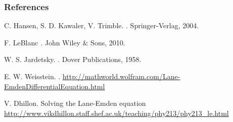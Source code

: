 \documentclass[handout]{beamer}
\begin{document}
        \begin{frame}[allowframebreaks]
            \frametitle{References}
            \begin{thebibliography}{10}

                \beamertemplatebookbibitems

                    C. Hansen, S. D. Kawaler, V. Trimble.
                    .
                    \newblock Springer-Verlag, 2004.

                    F. LeBlanc
                    .
                    \newblock John Wiley \& Sons, 2010.

                    W. S. Jardetsky.
                    .
                    \newblock Dover Publications, 1958.

                \beamertemplatearticlebibitems

                    E. W. Weisstein.
                    .
                    \newblock \url{http://mathworld.wolfram.com/Lane-EmdenDifferentialEquation.html}

                    V. Dhillon.
                    \newblock Solving the Lane-Emden equation
                    \newblock \url{http://www.vikdhillon.staff.shef.ac.uk/teaching/phy213/phy213\_le.html}


            \end{thebibliography}

        \end{frame}
\end{document}
